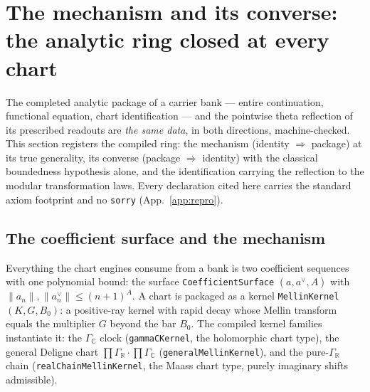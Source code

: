 \documentclass[11pt]{article}
\theoremstyle{definition}
\renewcommand{\Re}{\operatorname{Re}}
\begin{document}

\section{The mechanism and its converse: the analytic ring closed at every chart}\label{sec:mechanism-converse}

The completed analytic package of a carrier bank --- entire continuation, functional
equation, chart identification --- and the pointwise theta reflection of its prescribed
readouts are \emph{the same data}, in both directions, machine-checked.  This section
registers the compiled ring: the mechanism (identity $\Rightarrow$ package) at its true
generality, its converse (package $\Rightarrow$ identity) with the classical
boundedness hypothesis alone, and the identification carrying the reflection to the
modular transformation laws.  Every declaration cited here carries the standard axiom
footprint and no \texttt{sorry} (App.~\ref{app:repro}).

\subsection*{The coefficient surface and the mechanism}

Everything the chart engines consume from a bank is two coefficient sequences with one
polynomial bound: the surface \texttt{CoefficientSurface} $(a,a^\vee,A)$ with
$\|a_n\|,\|a^\vee_n\|\le (n+1)^A$.  A chart is packaged as a kernel
\texttt{MellinKernel} $(K,G,B_0)$: a positive-ray kernel with rapid decay whose Mellin
transform equals the multiplier $G$ beyond the bar $B_0$.  The compiled kernel families
instantiate it: the $\Gamma_{\mathbb C}$ clock (\texttt{gammaCKernel}, the holomorphic
chart type), the general Deligne chart $\prod\Gamma_{\mathbb R}\cdot\prod\Gamma_{\mathbb C}$
(\texttt{generalMellinKernel}), and the pure-$\Gamma_{\mathbb R}$ chain
(\texttt{realChainMellinKernel}, the Maass chart type, purely imaginary shifts
admissible).
\end{document}
